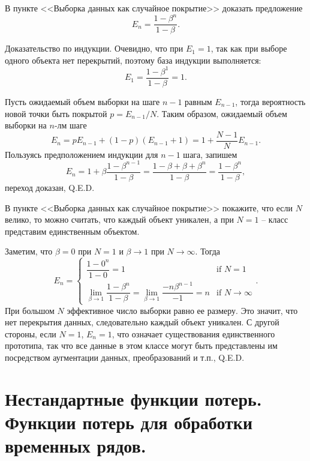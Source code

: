 \begin{problem}
    В пункте <<Выборка данных как случайное покрытие>>  доказать предложение
    \[
        E_n=\dfrac{1-\beta^n}{1-\beta}.
    \]
\end{problem}

\begin{solution}
    Доказательство по индукции. Очевидно, что при $E_1=1$, так как при выборе одного объекта нет перекрытий, поэтому база индукции выполняется:
    \[
        E_1=\dfrac{1-\beta^1}{1-\beta}=1.
    \]

    Пусть ожидаемый объем выборки на шаге $n-1$ равным $E_{n-1}$, тогда вероятность новой точки быть покрытой $p=E_{n-1}/N$. Таким образом, ожидаемый объем выборки на $n$-лм шаге
    \[
        E_n=pE_{n-1}+(1-p)(E_{n-1}+1)=1+\dfrac{N-1}{N}E_{n-1}.
    \]
    Пользуясь предположением индукции для $n-1$ шага, запишем
    \[
        E_n=1+\beta\dfrac{1-\beta^{n-1}}{1-\beta}=\dfrac{1-\beta+\beta+\beta^{n}}{1-\beta}=\dfrac{1-\beta^{n}}{1-\beta},
    \]
    переход доказан, Q.E.D.
\end{solution}

\begin{problem}
    В пункте <<Выборка данных как случайное покрытие>>  покажите, что если $N$ велико, то можно считать, что каждый объект уникален, а при $N=1$ -- класс представим единственным объектом.
\end{problem}

\begin{solution}
    Заметим, что $\beta=0$ при $N=1$ и $\beta \to 1$ при $N \to \infty$. Тогда
    \[
        E_n=\begin{cases}
            \dfrac{1-0^n}{1-0}=1 & \text{if } N=1 \\
            \lim\limits_{\beta \to 1}\dfrac{1-\beta^n}{1-\beta}=\lim\limits_{\beta \to 1}\dfrac{-n\beta^{n-1}}{-1}=n & \text{if } N \to \infty
        \end{cases}.
    \]
    При большом $N$ эффективное число выборки равно ее размеру. Это значит, что нет перекрытия данных, следовательно каждый объект уникален. С другой стороны, если $N=1$, $E_n=1$, что означает существования единственного прототипа, так что все данные в этом классе могут быть представлены им посредством аугментации данных, преобразований и т.п., Q.E.D.
\end{solution}

\newpage

\section*{Нестандартные функции потерь. Функции потерь для обработки временных рядов.}

